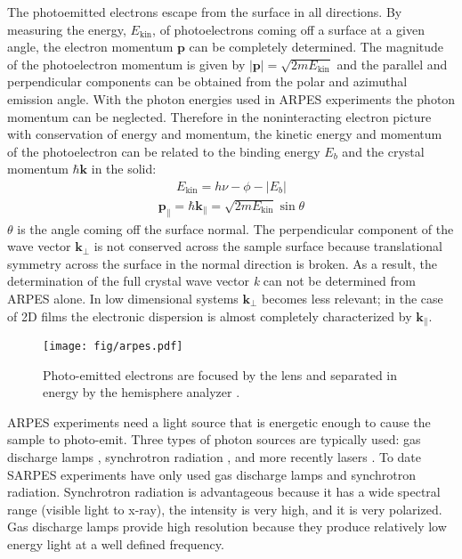 \documentclass[12pt]{article}
\begin{document}
The photoemitted electrons escape from the surface in all directions.
By measuring the energy, $E_{\text{kin}}$, of photoelectrons coming off a surface at a given angle, the electron momentum $\boldsymbol{p}$ can be completely determined.
The magnitude of the photoelectron momentum is given by $|\boldsymbol{p}|=\sqrt{2mE_{\text{kin}}}$ and the parallel and perpendicular components can be obtained from the polar and azimuthal emission angle.
With the photon energies used in ARPES experiments the photon momentum can be neglected.
Therefore in the noninteracting electron picture with conservation of energy and momentum, the kinetic energy and momentum of the photoelectron can be related to the binding energy $E_b$ and the crystal momentum $\hbar\boldsymbol{k}$ in the solid\cite{Damascelli}:
\begin{align}
  E_{\text{kin}}=h\nu-\phi-|E_b|
\end{align}
\begin{align}
  \boldsymbol{p_{\parallel}}=\hbar\boldsymbol{k_{\parallel}}=\sqrt{2mE_{\text{kin}}}\sin\theta
\end{align}
$\theta$ is the angle coming off the surface normal.
The perpendicular component of the wave vector $\boldsymbol{k_{\perp}}$ is not conserved across the sample surface because translational symmetry across the surface in the normal direction is broken.  
As a result, the determination of the full crystal wave vector \emph{k} can not be determined from ARPES alone.
In low dimensional systems $\boldsymbol{k_{\perp}}$ becomes less relevant; in the case of 2D films the electronic dispersion is almost completely characterized by $\boldsymbol{k_{\parallel}}$.

\begin{figure}[h]
  \centering
  \texttt{[image: fig/arpes.pdf]}
  \caption{Photo-emitted electrons are focused by the lens and separated in energy by the hemisphere analyzer \cite{Damascelli}.}
  \label{fig:arpes}
\end{figure}
ARPES experiments need a light source that is energetic enough to cause the sample to photo-emit.
Three types of photon sources are typically used:  gas discharge lamps \cite{Damascelli}, synchrotron radiation \cite{Damascelli}, and more recently lasers \cite{Dessau}.
To date SARPES experiments have only used gas discharge lamps and synchrotron radiation.
Synchrotron radiation is advantageous because it has a wide spectral range (visible light to x-ray), the intensity is very high, and it is very polarized.
Gas discharge lamps provide high resolution because they produce relatively low energy light at a well defined frequency.
\end{document}
